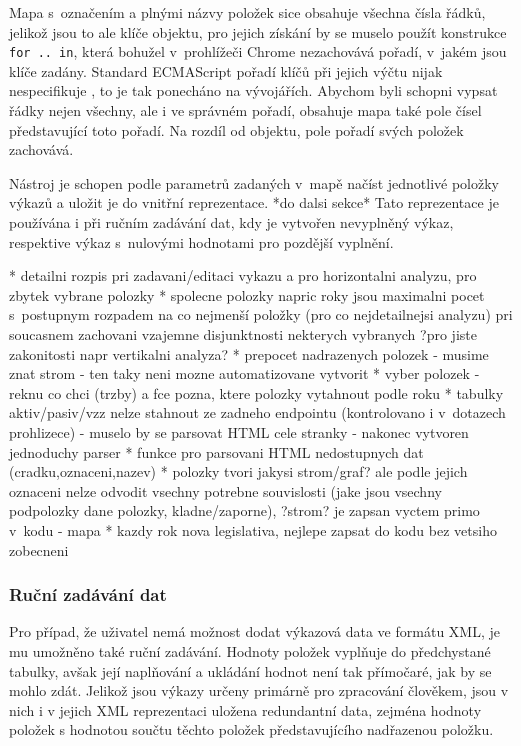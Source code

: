 Mapa s~označením a plnými názvy položek sice obsahuje všechna čísla řádků, jelikož jsou to ale klíče objektu, pro jejich získání by se muselo použít konstrukce \texttt{for .. in}, která bohužel v~prohlížeči Chrome nezachovává pořadí, v~jakém jsou klíče zadány. Standard ECMAScript pořadí klíčů při jejich výčtu nijak nespecifikuje \cite{proporder}, to je tak ponecháno na vývojářích. Abychom byli schopni vypsat řádky nejen všechny, ale i ve správném pořadí, obsahuje mapa také pole čísel představující toto pořadí. Na rozdíl od objektu, pole pořadí svých položek zachovává.

Nástroj je schopen podle parametrů zadaných v~mapě načíst jednotlivé položky výkazů a uložit je do vnitřní reprezentace. *do dalsi sekce* Tato reprezentace je používána i při ručním zadávání dat, kdy je vytvořen nevyplněný výkaz, respektive výkaz s~nulovými hodnotami pro pozdější vyplnění. 

* detailni rozpis pri zadavani/editaci vykazu a pro horizontalni analyzu, pro zbytek vybrane polozky
* spolecne polozky napric roky jsou maximalni pocet s~postupnym rozpadem na co nejmenší položky (pro co nejdetailnejsi analyzu) pri soucasnem zachovani vzajemne disjunktnosti nekterych vybranych ?pro jiste zakonitosti napr vertikalni analyza?
* prepocet nadrazenych polozek - musime znat strom - ten taky neni mozne automatizovane vytvorit
* vyber polozek - reknu co chci (trzby) a fce pozna, ktere polozky vytahnout podle roku
* tabulky aktiv/pasiv/vzz nelze stahnout ze zadneho endpointu (kontrolovano i v~dotazech prohlizece) - muselo by se parsovat HTML cele stranky - nakonec vytvoren jednoduchy parser
* funkce pro parsovani HTML nedostupnych dat (cradku,oznaceni,nazev)
* polozky tvori jakysi strom/graf? ale podle jejich oznaceni nelze odvodit vsechny potrebne souvislosti (jake jsou vsechny podpolozky dane polozky, kladne/zaporne), ?strom? je zapsan vyctem primo v~kodu - mapa
* kazdy rok nova legislativa, nejlepe zapsat do kodu bez vetsiho zobecneni

\subsubsection{Ruční zadávání dat}
Pro případ, že uživatel nemá možnost dodat výkazová data ve formátu XML, je mu umožněno také ruční zadávání. Hodnoty položek vyplňuje do předchystané tabulky, avšak její naplňování a ukládání hodnot není tak přímočaré, jak by se mohlo zdát. Jelikož jsou výkazy určeny primárně pro zpracování člověkem, jsou v nich i v jejich XML reprezentaci uložena redundantní data, zejména hodnoty položek s hodnotou součtu těchto položek představujícího nadřazenou položku. 

